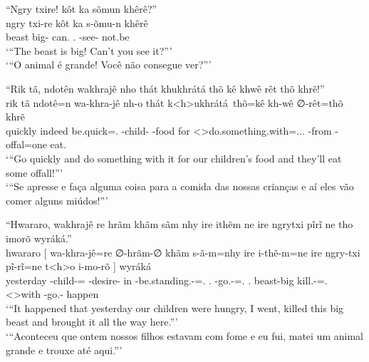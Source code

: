 \documentclass[output=paper,
modfonts,nonflat
]{langsci/langscibook}
\begin{document}
\ea  ``Ngry txire! kôt ka sõmun khêrê?'' \\[.3em]
\gll ngry  txi-re     kôt        ka             s-õmu-n            khêrê  \\
     beast big-\Adj{} can.\Fut{} \Second.\Nom{} \Third-see-\Nmlz{} not.be \\
\glt `{}``The beast is big! Can't you see it?''{}' \\
     `{}``O animal é grande! Você não consegue ver?''{}' \\
\z

\ea  ``Rik tã, ndotên wakhrajê nho thát khukhrátá thõ kê khwê rêt thõ khrẽ!'' \\[.3em]
\gll rik     tã     ndotê=n             wa-khra-jê              nh-o    thát k<h>ukhrátá\ thõ=kê                              kh-wê       ∅-rêt=thõ        khrẽ    \\
     quickly indeed be.quick=\AAnd.\Ss{} \First\Incl-child-\Pl{} \E-food for  <\Third>do.something.with=\AAnd.\Ds.\Third.\Fut{} \Third-from \Third-offal=one eat.\Pl \\
\glt `{}``Go quickly and do something with it for our children's food and they'll eat some offall!''{}' \\
     `{}``Se apresse e faça alguma coisa para a comida das nossas crianças e aí eles vão comer alguns miúdos!''{}' \\
\z

\ea  ``Hwararo, wakhrajê re hrãm khãm sãm nhy ire ithẽm ne ire ngrytxi pĩrĩ ne tho imorõ wyráká.'' \\[.3em]
\gll hwararo   [  wa-khra-jê=re                  ∅-hrãm-∅              khãm s-ã-m=nhy                                 ire           i-thẽ-m=ne                       ire           ngry-txi  pĩ-rĩ=ne                    t<h>o        i-mo-rõ               ]  wyráká \\
     yesterday {} \First\Incl-child-\Pl{}=\Erg{} \Third-desire-\Nmlz{} in   \Third-be.standing.\Sg-\Nmlz{}=\AAnd.\Ds{} \First.\Erg{} \First-go.\Sg-\Nmlz{}=\AAnd.\Ss{} \First.\Erg{} beast-big kill.\Sg-\Nmlz{}=\AAnd.\Ss{} <\Third>with \First-go.\Pl-\Nmlz{} {} happen \\
\glt `{}``It happened that yesterday our children were hungry, I went, killed this big beast and brought it all the way here.''{}' \\
     `{}``Aconteceu que ontem nossos filhos estavam com fome e eu fui, matei um animal grande e trouxe até aqui.''{}' \\
\label{exe:ergabsemb}
\z
\end{document}
